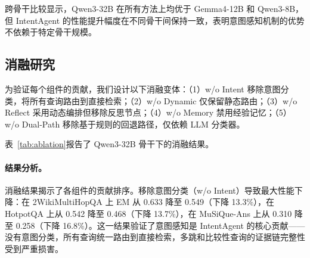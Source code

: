 \documentclass[runningheads]{llncs}
\begin{document}
跨骨干比较显示，Qwen3-32B 在所有方法上均优于 Gemma4-12B 和 Qwen3-8B，但 IntentAgent 的性能提升幅度在不同骨干间保持一致，表明意图感知机制的优势不依赖于特定骨干规模。

\subsection{消融研究}

为验证每个组件的贡献，我们设计以下消融变体：（1）w/o Intent 移除意图分类，将所有查询路由到直接检索；（2）w/o Dynamic 仅保留静态路由；（3）w/o Reflect 采用动态编排但移除反思节点；（4）w/o Memory 禁用经验记忆；（5）w/o Dual-Path 移除基于规则的回退路径，仅依赖 LLM 分类器。

表~\ref{tab:ablation}报告了 Qwen3-32B 骨干下的消融结果。

\begin{table}[htbp]
\centering
\caption{消融结果（骨干：Qwen3-32B）。}
\label{tab:ablation}
\end{table}

\paragraph{结果分析。}

消融结果揭示了各组件的贡献排序。移除意图分类（w/o Intent）导致最大性能下降：在 2WikiMultiHopQA 上 EM 从 0.633 降至 0.549（下降 13.3\%），在 HotpotQA 上从 0.542 降至 0.468（下降 13.7\%），在 MuSiQue-Ans 上从 0.310 降至 0.258（下降 16.8\%）。这一结果验证了意图感知是 IntentAgent 的核心贡献——没有意图分类，所有查询统一路由到直接检索，多跳和比较性查询的证据链完整性受到严重损害。
\end{document}
